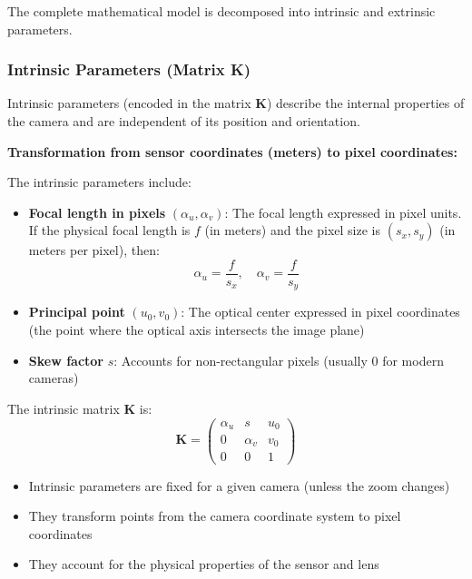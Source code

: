 \documentclass[11pt,a4paper]{article}
\theoremstyle{definition}
\theoremstyle{plain}
\theoremstyle{remark}
\begin{document}
The complete mathematical model is decomposed into intrinsic and extrinsic parameters.

\subsubsection{Intrinsic Parameters (Matrix K)}

Intrinsic parameters (encoded in the matrix $\mathbf{K}$) describe the internal properties of the camera and are independent of its position and orientation.

\textbf{Transformation from sensor coordinates (meters) to pixel coordinates:}

The intrinsic parameters include:

\begin{itemize}
    \item \textbf{Focal length in pixels} $(\alpha_u, \alpha_v)$: The focal length expressed in pixel units. If the physical focal length is $f$ (in meters) and the pixel size is $(s_x, s_y)$ (in meters per pixel), then:
    \[
    \alpha_u = \frac{f}{s_x}, \quad \alpha_v = \frac{f}{s_y}
    \]
    \item \textbf{Principal point} $(u_0, v_0)$: The optical center expressed in pixel coordinates (the point where the optical axis intersects the image plane)
    \item \textbf{Skew factor} $s$: Accounts for non-rectangular pixels (usually 0 for modern cameras)
\end{itemize}

The intrinsic matrix $\mathbf{K}$ is:
\begin{equation} \label{eq:intrinsic_matrix}
    \mathbf{K} = \begin{pmatrix}
    \alpha_u & s & u_0 \\
    0 & \alpha_v & v_0 \\
    0 & 0 & 1
    \end{pmatrix}
\end{equation}

\begin{tcolorbox}[colback=cyan!5!white,colframe=cyan!75!black,title=\textbf{Intrinsic Parameters}]
\begin{itemize}
    \item Intrinsic parameters are fixed for a given camera (unless the zoom changes)
    \item They transform points from the camera coordinate system to pixel coordinates
    \item They account for the physical properties of the sensor and lens
\end{itemize}
\end{tcolorbox}
\end{document}
